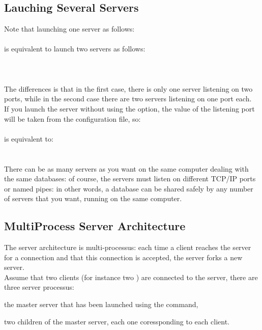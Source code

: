 \subsection{Lauching Several Servers}
Note that launching one \eyedb server as follows:\\
\\
is equivalent to launch two \eyedb servers as follows:\\
\\
\\
\\
The differences is that in the first case, there is only one server listening
on two ports, while in the second case there are two servers listening on
one port each.\\
If you launch the server without using the  option,
the value of the listening port will be taken from the configuration
file, so:\\
\\
is equivalent to:\\
\\
\\
There can be as many servers as you want on the same computer dealing
with the same databases: of course, the servers must listen on different
TCP/IP ports or named pipes: in other words, a database can be shared
safely by any number of servers that you want, running on the same computer.
\subsection{MultiProcess Server Architecture}
The \eyedb server architecture is multi-processus: each time a client
reaches the server for a connection and that this connection is accepted,
the server forks a new server.
\\
Assume that two clients (for instance two
) are connected to the \eyedb server, there are three
server processus:
\bi
\item the master server that has been launched using the 
command,
\item two children of the master server, each one coressponding to each
client.
\ei

